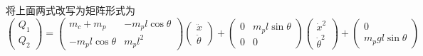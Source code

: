 \documentclass{homework}
\begin{document}
\begin{sol}
将上面两式改写为矩阵形式为
\[
  \begin{pmatrix}
    Q_1 \\
    Q_2
  \end{pmatrix} =
  \begin{pmatrix}
    m_c + m_p & - m_p l \cos\theta \\
    - m_p l \cos\theta & m_p l^2
  \end{pmatrix}
  \begin{pmatrix}
    \ddot{x} \\
    \ddot{\theta}
  \end{pmatrix} +
  \begin{pmatrix}
    0 & m_p l \sin\theta \\
    0 & 0
  \end{pmatrix}
  \begin{pmatrix}
    \dot{x}^2 \\
    \dot{\theta}^2
  \end{pmatrix} +
  \begin{pmatrix}
    0 \\
    m_p g l \sin\theta
  \end{pmatrix}
\]

\end{sol}

\question
\end{document}

